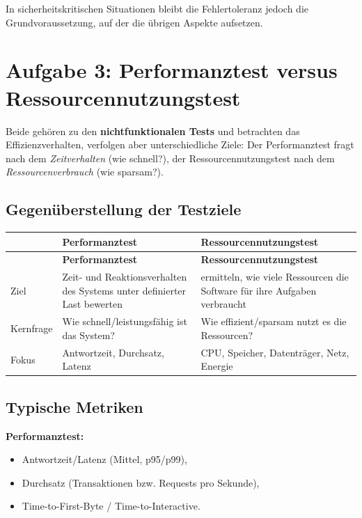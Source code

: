 \documentclass[
	fontsize=12pt,          %
	paper=a4,               %
	numbers=noenddot,       %
	listof=totoc,           %
	listof=entryprefix,     %
	listof=nochaptergap,    %
	bibliography=totoc,     %
	parskip=half,           %
	openany                 %
]{scrbook}
\begin{document}
In sicherheitskritischen Situationen bleibt die Fehlertoleranz jedoch die
Grundvoraussetzung, auf der die übrigen Aspekte aufsetzen.



\chapter*{Aufgabe 3: Performanztest versus Ressourcennutzungstest}

Beide gehören zu den \textbf{nichtfunktionalen Tests} und betrachten das
Effizienzverhalten, verfolgen aber unterschiedliche Ziele: Der Performanztest
fragt nach dem \emph{Zeitverhalten} (wie schnell?), der Ressourcennutzungstest
nach dem \emph{Ressourcenverbrauch} (wie sparsam?).

\section*{Gegenüberstellung der Testziele}

\begin{longtable}{| p{2.8cm} | p{5.0cm} | p{5.0cm} |}
	\hline
	\textbf{} & \textbf{Performanztest} & \textbf{Ressourcennutzungstest} \\ \hline
	\endfirsthead
	\hline
	\textbf{} & \textbf{Performanztest} & \textbf{Ressourcennutzungstest} \\ \hline
	\endhead
	\hline
	\endfoot
	Ziel & Zeit- und Reaktionsverhalten des Systems unter definierter Last
	bewerten & ermitteln, wie viele Ressourcen die Software für ihre Aufgaben
	verbraucht \\ \hline
	Kernfrage & Wie schnell/leistungsfähig ist das System? & Wie effizient/sparsam
	nutzt es die Ressourcen? \\ \hline
	Fokus & Antwortzeit, Durchsatz, Latenz & CPU, Speicher, Datenträger, Netz,
	Energie \\ \hline
\end{longtable}

\section*{Typische Metriken}

\textbf{Performanztest:}
\begin{itemize}
	\item Antwortzeit/Latenz (Mittel, p95/p99),
	\item Durchsatz (Transaktionen bzw. Requests pro Sekunde),
	\item Time-to-First-Byte / Time-to-Interactive.
\end{itemize}
\end{document}

